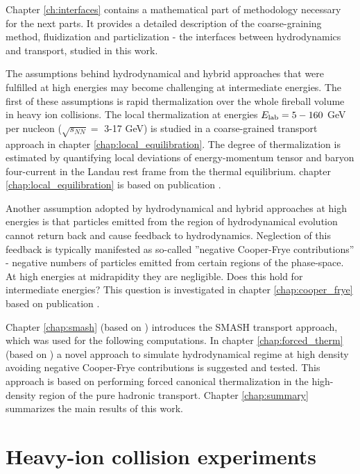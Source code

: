 Chapter \ref{ch:interfaces} contains a mathematical part of methodology necessary
for the next parts. It provides a detailed description of the coarse-graining method,
fluidization and particlization - the interfaces between hydrodynamics and transport,
studied in this work.

The assumptions behind hydrodynamical and hybrid approaches that were fulfilled
at high energies may become challenging at intermediate energies. The first of these
assumptions is rapid thermalization over the whole fireball volume in heavy ion
collisions. The local thermalization at energies $E_\mathrm{lab} = 5-160$ GeV per nucleon
($\sqrt{s_{NN}} = $ 3-17 GeV) is studied in a coarse-grained transport
approach in chapter \ref{chap:local_equilibration}.  The degree of
thermalization is estimated by quantifying local deviations of energy-momentum
tensor and baryon four-current in the Landau rest frame from the thermal equilibrium.
chapter \ref{chap:local_equilibration} is based on publication \cite{Oliinychenko:2015lva}.

Another assumption adopted by hydrodynamical and hybrid approaches at high
energies is that particles emitted from the region of hydrodynamical evolution
cannot return back and cause feedback to hydrodynamics. Neglection of
this feedback is typically manifested as so-called ''negative Cooper-Frye
contributions'' - negative numbers of particles emitted from certain regions of
the phase-space. At high energies at midrapidity they are negligible. Does this
hold for intermediate energies?  This question is investigated in chapter
\ref{chap:cooper_frye} based on publication \cite{Oliinychenko:2014tqa}.

Chapter \ref{chap:smash} (based on \cite{Weil:2016zrk}) introduces the SMASH
transport approach, which was used for the following computations.
In chapter \ref{chap:forced_therm} (based on \cite{Oliinychenko:2016vkg})
a novel approach to simulate hydrodynamical regime at high density
avoiding negative Cooper-Frye contributions is suggested and tested.
This approach is based on performing forced canonical thermalization in the
high-density region of the pure hadronic transport.
Chapter \ref{chap:summary} summarizes the main results of this work.

\section{Heavy-ion collision experiments} \label{sec:HI_exp}


